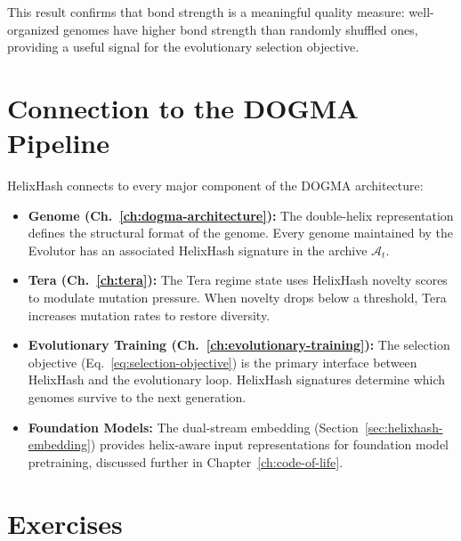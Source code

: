 This result confirms that bond strength is a meaningful quality measure: well-organized genomes have higher bond strength than randomly shuffled ones, providing a useful signal for the evolutionary selection objective.

\section{Connection to the DOGMA Pipeline}
\label{sec:helixhash-pipeline}

HelixHash connects to every major component of the DOGMA architecture:

\begin{itemize}[leftmargin=1.5em]
  \item \textbf{Genome (Ch.~\ref{ch:dogma-architecture}):} The double-helix representation defines the structural format of the genome. Every genome maintained by the Evolutor has an associated HelixHash signature in the archive $\mathcal{A}_t$.
  \item \textbf{Tera (Ch.~\ref{ch:tera}):} The Tera regime state uses HelixHash novelty scores to modulate mutation pressure. When novelty drops below a threshold, Tera increases mutation rates to restore diversity.
  \item \textbf{Evolutionary Training (Ch.~\ref{ch:evolutionary-training}):} The selection objective (Eq.~\ref{eq:selection-objective}) is the primary interface between HelixHash and the evolutionary loop. HelixHash signatures determine which genomes survive to the next generation.
  \item \textbf{Foundation Models:} The dual-stream embedding (Section~\ref{sec:helixhash-embedding}) provides helix-aware input representations for foundation model pretraining, discussed further in Chapter~\ref{ch:code-of-life}.
\end{itemize}

\section{Exercises}
\label{sec:ch8-exercises}

